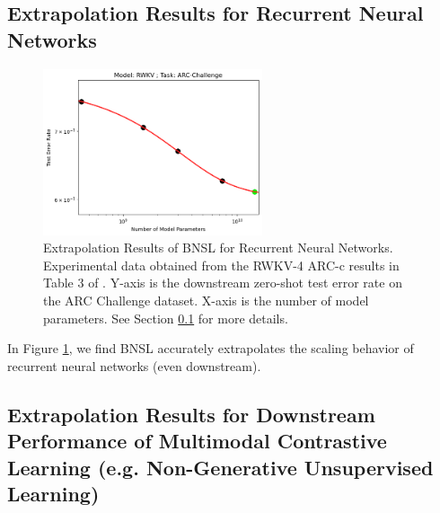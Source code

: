 \documentclass{article} %
\begin{document}
\subsection{Extrapolation Results for Recurrent Neural Networks}
\label{section:recurrent}

\begin{figure}[htbp]
    \centering
\includegraphics[width=0.575\textwidth]{figures/recurrent/recurrent.png}
    \caption{
Extrapolation Results of BNSL for Recurrent Neural Networks. Experimental data obtained from the RWKV-4 ARC-c results in Table 3 of \cite{peng2023rwkv}. Y-axis is the downstream zero-shot test error rate on the ARC Challenge dataset. X-axis is the number of model parameters. See Section \ref{section:recurrent} for more details.
    }
    \label{fig:recurrent}
\end{figure}

In Figure \ref{fig:recurrent}, we find BNSL accurately extrapolates the scaling behavior of recurrent neural networks (even downstream).

\clearpage



\clearpage

\subsection{Extrapolation Results for Downstream Performance of Multimodal Contrastive Learning (e.g. Non-Generative Unsupervised Learning)}
\label{section:extrapolate_contrastive}
\end{document}
